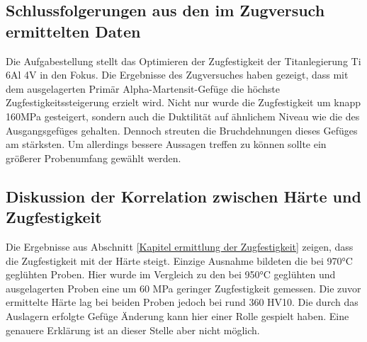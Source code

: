 \documentclass[a4paper, 11pt]{tubsreprt}
\begin{document}
\subsection{Schlussfolgerungen aus den im Zugversuch ermittelten Daten}
 Die Aufgabestellung stellt das Optimieren der Zugfestigkeit der Titanlegierung Ti 6Al 4V in den Fokus. Die Ergebnisse des Zugversuches haben gezeigt, dass mit dem ausgelagerten Primär Alpha-Martensit-Gefüge die höchste Zugfestigkeitssteigerung erzielt wird. Nicht nur wurde die Zugfestigkeit um knapp 160MPa gesteigert, sondern auch die Duktilität auf ähnlichem Niveau wie die des Ausgangsgefüges gehalten. Dennoch streuten die Bruchdehnungen dieses Gefüges am stärksten. Um allerdings bessere Aussagen treffen zu können sollte ein größerer Probenumfang gewählt werden.
\subsection{Diskussion der Korrelation zwischen Härte und Zugfestigkeit}
Die Ergebnisse aus Abschnitt \ref{Kapitel ermittlung der Zugfestigkeit} zeigen, dass die Zugfestigkeit mit der Härte steigt. Einzige Ausnahme bildeten die bei 970°C geglühten Proben. Hier wurde im Vergleich zu den bei 950°C geglühten und ausgelagerten Proben eine um 60 MPa geringer Zugfestigkeit gemessen. Die zuvor ermittelte Härte lag bei beiden Proben jedoch bei rund 360 HV10. Die durch das Auslagern erfolgte Gefüge Änderung kann hier einer Rolle gespielt haben. Eine genauere Erklärung ist an dieser Stelle aber nicht möglich. 
\end{document}

